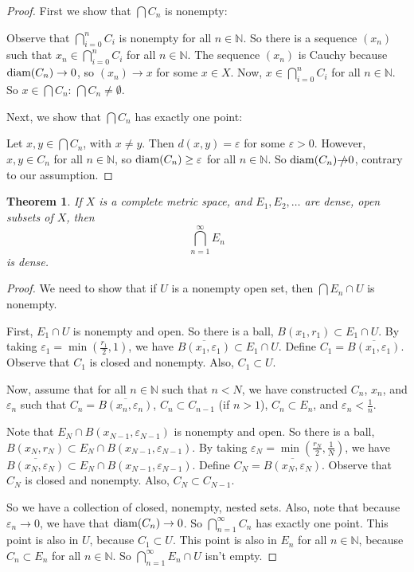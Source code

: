 \documentclass{amsart}
\newcommand{\vep}{\varepsilon}
\newcommand{\N}{\mathbb{N}}
\newcommand{\diam}{\text{\rm diam}}
\newtheorem{thm}{Theorem}[section]
\theoremstyle{definition}
\begin{document}
\begin{proof}
First we show that $\bigcap C_n$ is nonempty: 

Observe that $\bigcap\limits_{i=0}^n C_i$ is nonempty for all $n \in \N$. 
So there is a sequence $(x_n)$ such that $x_n \in \bigcap\limits_{i=0}^n C_i$ for all $n \in \N$. 
The sequence $(x_n)$ is Cauchy because $\diam(C_n) \to 0$, so $(x_n) \to x$ for some $x \in X$.
Now, $x \in \bigcap\limits_{i=0}^n C_i$ for all $n \in \N$.
So $x \in \bigcap C_n$: $\bigcap C_n \neq \emptyset$.

Next, we show that $\bigcap C_n$ has exactly one point:

Let $x, y \in \bigcap C_n$, with $x \neq y$. 
Then $d(x,y) = \vep$ for some $\vep >0$. 
However, $x,y \in C_n$ for all $n \in \N$,
so $\diam(C_n) \geq \vep$ for all $n \in \N$. 
So $\diam(C_n) \slashed{\to} 0$, contrary to our assumption.
\end{proof}

\begin{thm}If $X$ is a complete metric space, and $E_1, E_2, \ldots$ are dense, open subsets of $X$, then
\begin{displaymath}
\bigcap\limits_{n = 1}^{\infty} E_n
\end{displaymath}
is dense.
\end{thm}

\begin{proof}
We need to show that if $U$ is a nonempty open set, then $\bigcap E_n \cap U$ is nonempty.

First, $E_1 \cap U$ is nonempty and open.
So there is a ball, $B(x_1,r_1) \subset E_1 \cap U$.
By taking $\vep_1 = \min(\frac{r_1}{2},1)$, we have $\overline{B(x_1,\vep_1)} \subset E_1 \cap U$.
Define $C_1 = \overline{B(x_1,\vep_1)}$.
Observe that $C_1$ is closed and nonempty. Also, $C_1 \subset U$.

Now, assume that for all $n \in \N$ such that $n < N$, we have constructed $C_{n}$, $x_{n}$, and $\vep_{n}$ such that $C_{n} = \overline{B(x_{n},\vep_{n})}$, $C_n \subset C_{n-1}$ (if $n >1$), $C_{n} \subset E_{n}$, and $\vep_{n} < \frac{1}{n}$.

Note that $E_N \cap B(x_{N-1},\vep_{N-1})$ is nonempty and open.
So there is a ball, $B(x_N,r_N) \subset E_N \cap B(x_{N-1},\vep_{N-1})$.
By taking $\vep_N = \min(\frac{r_N}{2},\frac{1}{N})$, we have $\overline{B(x_N,\vep_N)} \subset E_N \cap B(x_{N-1},\vep_{N-1})$.
Define $C_N = \overline{B(x_N,\vep_N)}$.
Observe that $C_N$ is closed and nonempty. Also, $C_N \subset C_{N-1}$.

So we have a collection of closed, nonempty, nested sets.
Also, note that because $\vep_n \to 0$, we have that $\diam(C_n) \to 0$. 
So $\bigcap\limits_{n=1}^\infty C_n$ has exactly one point.
This point is also in $U$, because $C_1 \subset U$.
This point is also in $E_n$ for all $n \in \N$, because $C_n \subset E_n$ for all $n \in \N$.
So $\bigcap\limits_{n=1}^\infty E_n \cap U$ isn't empty.

\end{proof}
\end{document}
